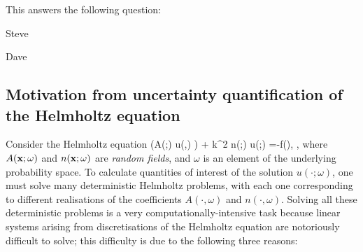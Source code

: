 This  answers the following question:


\bit
\item Steve
\item Dave
\eit

\subsection{Motivation from uncertainty quantification of the Helmholtz equation} 
Consider the Helmholtz equation 
\beqs%
\nabla\cdot\big(A(\bx;\omega) \nabla u(\bx,\omega) \big) + k^2 n(\bx;\omega) u(\bx;\omega) =-f(\bx), \quad \bx\in\Dp,
\eeqs
where $A(\mathbf{x};\omega)$ and $n(\mathbf{x};\omega)$ are \emph{random fields}, and $\omega$ is an element of the underlying probability space.
To calculate quantities of interest of the solution $u(\cdot;\omega)$, one must solve many deterministic Helmholtz problems, with each one corresponding to different realisations of the coefficients $A(\cdot,\omega)$ and $n(\cdot,\omega)$.
Solving all these deterministic problems is a very computationally-intensive task because linear systems arising from discretisations of the Helmholtz equation are notoriously difficult to solve; this difficulty is due to the following three reasons:

